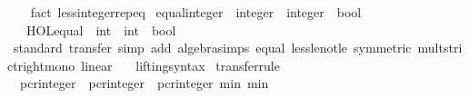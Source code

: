 \begin{isabellebody}
%
\isadelimproof
\ \ %
\endisadelimproof
%
\isatagproof
{}\isamarkupfalse%
\ {\isacharparenleft}{\kern0pt}fact\ less{\isacharunderscore}{\kern0pt}integer{\isachardot}{\kern0pt}rep{\isacharunderscore}{\kern0pt}eq{\isacharparenright}{\kern0pt}%
\endisatagproof
{\isafoldproof}%
%
\isadelimproof
\isanewline
%
\endisadelimproof
\isanewline
{}\isamarkupfalse%
\ equal{\isacharunderscore}{\kern0pt}integer\ {\isacharcolon}{\kern0pt}{\isacharcolon}{\kern0pt}\ {\isachardoublequoteopen}integer\ {\isasymRightarrow}\ integer\ {\isasymRightarrow}\ bool{\isachardoublequoteclose}\isanewline
\ \ \ {\isachardoublequoteopen}HOL{\isachardot}{\kern0pt}equal\ {\isacharcolon}{\kern0pt}{\isacharcolon}{\kern0pt}\ int\ {\isasymRightarrow}\ int\ {\isasymRightarrow}\ bool{\isachardoublequoteclose}\isanewline
%
\isadelimproof
\ \ %
\endisadelimproof
%
\isatagproof
\isacommand{{\isachardot}{\kern0pt}}\isamarkupfalse%
%
\endisatagproof
{\isafoldproof}%
%
\isadelimproof
\isanewline
%
\endisadelimproof
\isanewline
{}\isamarkupfalse%
\isanewline
%
\isadelimproof
\ \ %
\endisadelimproof
%
\isatagproof
{}\isamarkupfalse%
\ standard\ {\isacharparenleft}{\kern0pt}transfer{\isacharcomma}{\kern0pt}\ simp\ add{\isacharcolon}{\kern0pt}\ algebra{\isacharunderscore}{\kern0pt}simps\ equal\ less{\isacharunderscore}{\kern0pt}le{\isacharunderscore}{\kern0pt}not{\isacharunderscore}{\kern0pt}le\ {\isacharbrackleft}{\kern0pt}symmetric{\isacharbrackright}{\kern0pt}\ mult{\isacharunderscore}{\kern0pt}strict{\isacharunderscore}{\kern0pt}right{\isacharunderscore}{\kern0pt}mono\ linear{\isacharparenright}{\kern0pt}{\isacharplus}{\kern0pt}%
\endisatagproof
{\isafoldproof}%
%
\isadelimproof
\isanewline
%
\endisadelimproof
\isanewline
{}\isamarkupfalse%
\isanewline
\isanewline
{}\isamarkupfalse%
\isanewline
\ \ \ lifting{\isacharunderscore}{\kern0pt}syntax\isanewline
{}\isanewline
\isanewline
{}\isamarkupfalse%
\ {\isacharbrackleft}{\kern0pt}transfer{\isacharunderscore}{\kern0pt}rule{\isacharbrackright}{\kern0pt}{\isacharcolon}{\kern0pt}\isanewline
\ \ {\isacartoucheopen}{\isacharparenleft}{\kern0pt}pcr{\isacharunderscore}{\kern0pt}integer\ {\isacharequal}{\kern0pt}{\isacharequal}{\kern0pt}{\isacharequal}{\kern0pt}{\isachargreater}{\kern0pt}\ pcr{\isacharunderscore}{\kern0pt}integer\ {\isacharequal}{\kern0pt}{\isacharequal}{\kern0pt}{\isacharequal}{\kern0pt}{\isachargreater}{\kern0pt}\ pcr{\isacharunderscore}{\kern0pt}integer{\isacharparenright}{\kern0pt}\ min\ min{\isacartoucheclose}\isanewline

\end{isabellebody}
